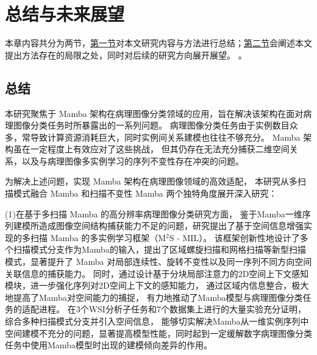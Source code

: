 \chapter[\hspace{0pt}总结与未来展望]{{\heiti{}\hspace{0pt}总结与未来展望}}\label{section 7}
\removelofgap
\removelotgap

本章内容共分为两节，\hyperref[section5: 总结]{第一节}对本文研究内容与方法进行总结；\hyperref[section5: 未来展望]{第二节}会阐述本文提出方法存在的局限之处，同时对后续的研究方向展开展望。
。

\section[\hspace{-2pt}总结]{{\heiti{} \hspace{-8pt}总结}}\label{section5: 总结}


本研究聚焦于 Mamba 架构在病理图像分类领域的应用，旨在解决该架构在面对病理图像分类任务时所暴露出的一系列问题。
病理图像分类任务由于实例数目众多，常导致计算资源消耗巨大，同时实例间关系建模也往往不够充分。
Mamba 架构虽在一定程度上有效应对了这些挑战，
但其仍存在无法充分捕获二维空间关系，以及与病理图像多实例学习的序列不变性存在冲突的问题。​

为解决上述问题，实现 Mamba 架构在病理图像领域的高效适配，
本研究从多扫描模式融合 Mamba 和扫描不变性 Mamba 两个独特角度展开深入研究：

(1)在基于多扫描 Mamba 的高分辨率病理图像分类研究方面，
鉴于Mamba一维序列建模所造成图像空间结构捕获能力不足的问题，研究提出了基于空间信息增强实现的多扫描 Mamba 的多实例学习框架（M$^2$S - MIL）。
该框架创新性地设计了多个扫描模式分支作为Mamba的输入，提出了区域螺旋扫描和网格扫描等新型扫描模式，显著提升了 Mamba 对局部连续性、旋转不变性以及同一序列不同方向空间关联信息的捕获能力。
同时，通过设计基于分块局部注意力的2D空间上下文感知模块，进一步强化序列对2D空间上下文的感知能力，
通过区域内信息整合，极大地提高了Mamba对空间能力的捕捉，
有力地推动了Mamba模型与病理图像分类任务的适配进程。
在3个WSI分析子任务和7个数据集上进行的大量实验充分证明，综合多种扫描模式分支并引入空间信息，
能够切实解决Mamba从一维实例序列中空间建模不充分的问题，显著提高模型性能，同时起到一定缓解数字病理图像分类任务中使用Mamba模型时出现的建模倾向差异的作用。​

